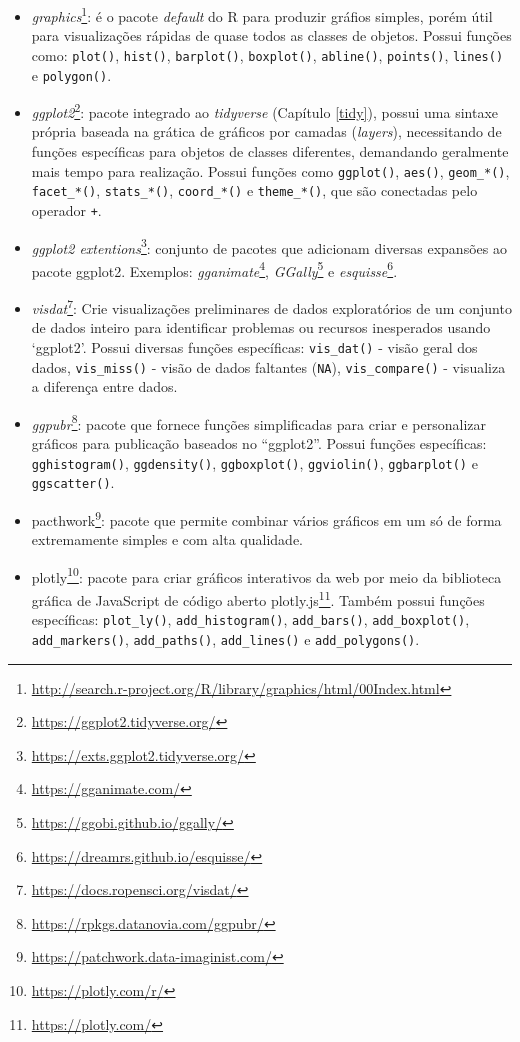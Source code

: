 \documentclass[
]{book}
\renewcommand{\href}[2]{#2\footnote{\url{#1}}}
\begin{document}
\begin{itemize}
\item
  \href{http://search.r-project.org/R/library/graphics/html/00Index.html}{\emph{graphics}}: é o pacote \emph{default} do R para produzir gráfios simples, porém útil para visualizações rápidas de quase todos as classes de objetos. Possui funções como: \texttt{plot()}, \texttt{hist()}, \texttt{barplot()}, \texttt{boxplot()}, \texttt{abline()}, \texttt{points()}, \texttt{lines()} e \texttt{polygon()}.
\item
  \href{https://ggplot2.tidyverse.org/}{\emph{ggplot2}}: pacote integrado ao \emph{tidyverse} (Capítulo \ref{tidy}), possui uma sintaxe própria baseada na grática de gráficos por camadas (\emph{layers}), necessitando de funções específicas para objetos de classes diferentes, demandando geralmente mais tempo para realização. Possui funções como \texttt{ggplot()}, \texttt{aes()}, \texttt{geom\_*()}, \texttt{facet\_*()}, \texttt{stats\_*()}, \texttt{coord\_*()} e \texttt{theme\_*()}, que são conectadas pelo operador \texttt{+}.
\item
  \href{https://exts.ggplot2.tidyverse.org/}{\emph{ggplot2 extentions}}: conjunto de pacotes que adicionam diversas expansões ao pacote ggplot2. Exemplos: \href{https://gganimate.com/}{\emph{gganimate}}, \href{https://ggobi.github.io/ggally/}{\emph{GGally}} e \href{https://dreamrs.github.io/esquisse/}{\emph{esquisse}}.
\item
  \href{https://docs.ropensci.org/visdat/}{\emph{visdat}}: Crie visualizações preliminares de dados exploratórios de um conjunto de dados inteiro para identificar problemas ou recursos inesperados usando `ggplot2'. Possui diversas funções específicas: \texttt{vis\_dat()} - visão geral dos dados, \texttt{vis\_miss()} - visão de dados faltantes (\texttt{NA}), \texttt{vis\_compare()} - visualiza a diferença entre dados.
\item
  \href{https://rpkgs.datanovia.com/ggpubr/}{\emph{ggpubr}}: pacote que fornece funções simplificadas para criar e personalizar gráficos para publicação baseados no ``ggplot2''. Possui funções específicas: \texttt{gghistogram()}, \texttt{ggdensity()}, \texttt{ggboxplot()}, \texttt{ggviolin()}, \texttt{ggbarplot()} e \texttt{ggscatter()}.
\item
  \href{https://patchwork.data-imaginist.com/}{pacthwork}: pacote que permite combinar vários gráficos em um só de forma extremamente simples e com alta qualidade.
\item
  \href{https://plotly.com/r/}{plotly}: pacote para criar gráficos interativos da web por meio da biblioteca gráfica de JavaScript de código aberto \href{https://plotly.com/}{plotly.js}. Também possui funções específicas: \texttt{plot\_ly()}, \texttt{add\_histogram()}, \texttt{add\_bars()}, \texttt{add\_boxplot()}, \texttt{add\_markers()}, \texttt{add\_paths()}, \texttt{add\_lines()} e \texttt{add\_polygons()}.
\end{itemize}
\end{document}
